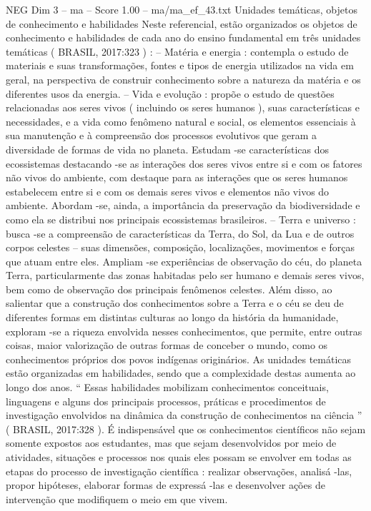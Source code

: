 \begin{textsample}{NEG Dim 3 – ma – Score 1.00 – ma/ma\_ef\_43.txt}  \label{ex:f3_neg_143}
Unidades temáticas, objetos de conhecimento e habilidades Neste referencial, estão organizados os objetos de conhecimento e habilidades de cada ano do ensino fundamental em três unidades temáticas ( BRASIL, 2017:323 ) : – Matéria e energia : contempla o estudo de materiais e suas transformações, fontes e tipos de energia utilizados na vida em geral, na perspectiva de construir conhecimento sobre a natureza da matéria e os diferentes usos da energia. – Vida e evolução : propõe o estudo de questões relacionadas aos seres vivos ( incluindo os seres humanos ), suas características e necessidades, e a vida como fenômeno natural e social, os elementos essenciais à sua manutenção e à compreensão dos processos evolutivos que geram a diversidade de formas de vida no planeta.
Estudam -se características dos ecossistemas destacando -se as interações dos seres vivos entre si e com os fatores não vivos do ambiente, com destaque para as interações que os seres humanos estabelecem entre si e com os demais seres vivos e elementos não vivos do ambiente.
Abordam -se, ainda, a importância da preservação da biodiversidade e como ela se distribui nos principais ecossistemas brasileiros. – Terra e universo : busca -se a compreensão de características da Terra, do Sol, da Lua e de outros corpos celestes – suas dimensões, composição, localizações, movimentos e forças que atuam entre eles.
Ampliam -se experiências de observação do céu, do planeta Terra, particularmente das zonas habitadas pelo ser humano e demais seres vivos, bem como de observação dos principais fenômenos celestes.
Além disso, ao salientar que a construção dos conhecimentos sobre a Terra e o céu se deu de diferentes formas em distintas culturas ao longo da história da humanidade, exploram -se a riqueza envolvida nesses conhecimentos, que permite, entre outras coisas, maior valorização de outras formas de conceber o mundo, como os conhecimentos próprios dos povos indígenas originários.
As unidades temáticas estão organizadas em habilidades, sendo que a complexidade destas aumenta ao longo dos anos. “ Essas habilidades mobilizam conhecimentos conceituais, linguagens e alguns dos principais processos, práticas e procedimentos de investigação envolvidos na dinâmica da construção de conhecimentos na ciência ” ( BRASIL, 2017:328 ).
É indispensável que os conhecimentos científicos não sejam somente expostos aos estudantes, mas que sejam desenvolvidos por meio de atividades, situações e processos nos quais eles possam se envolver em todas as etapas do processo de investigação científica : realizar observações, analisá -las, propor hipóteses, elaborar formas de expressá -las e desenvolver ações de intervenção que modifiquem o meio em que vivem.

\end{textsample}
